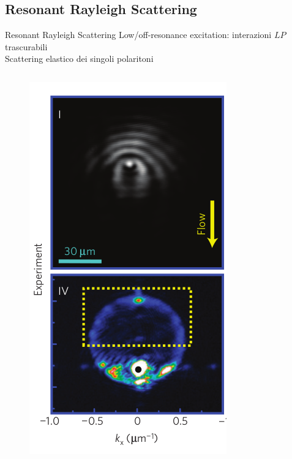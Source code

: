 \documentclass[10pt]{beamer}
\begin{document}
\subsection{Resonant Rayleigh Scattering}
\begin{frame}{Resonant Rayleigh Scattering}
Low/off-resonance excitation: interazioni $LP$ trascurabili\\
Scattering elastico dei singoli polaritoni
\begin{columns}[t]
  \begin{column}{.25\textwidth}
    \begin{figure}
        \includegraphics[width=\columnwidth]{pics/scattering-RRS-exp.png}

\end{figure}
\end{column}
\end{columns}
\end{frame}
\end{document}
